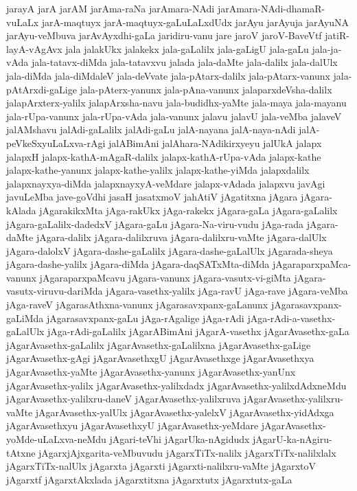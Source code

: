 {jarayA
jarA
jarAM
jarAma-raNa
jarAmara-NAdi
jarAmara-NAdi-dhamaR-vuLaLx
jarA-maqtuyx
jarA-maqtuyx-gaLuLaLxdUdx
jarAyu
jarAyuja
jarAyuNA
jarAyu-veMbuva
jarAvAyxdhi-gaLa
jaridiru-vanu
jare
jaroV
jaroV-BaveVtf
jatiR-layA-vAgAvx
jala
jalakUkx
jalakekx
jala-gaLalilx
jala-gaLigU
jala-gaLu
jala-ja-vAda
jala-tatavx-diMda
jala-tatavxvu
jalada
jala-daMte
jala-dalilx
jala-dalUlx
jala-diMda
jala-diMdaleV
jala-deVvate
jala-pAtarx-dalilx
jala-pAtarx-vanunx
jala-pAtArxdi-gaLige
jala-pAterx-yanunx
jala-pAna-vanunx
jalaparxdeVsha-dalilx
jalapArxterx-yalilx
jalapArxsha-navu
jala-budidhx-yaMte
jala-maya
jala-mayanu
jala-rUpa-vanunx
jala-rUpa-vAda
jala-vanunx
jalavu
jalavU
jala-veMba
jalaveV
jalAMshavu
jalAdi-gaLalilx
jalAdi-gaLu
jalA-nayana
jalA-naya-nAdi
jalA-peVkeSxyuLaLxva-rAgi
jalABimAni
jalAhara-NAdikirxyeyu
jalUkA
jalapx
jalapxH
jalapx-kathA-mAgaR-dalilx
jalapx-kathA-rUpa-vAda
jalapx-kathe
jalapx-kathe-yanunx
jalapx-kathe-yalilx
jalapx-kathe-yiMda
jalapxdalilx
jalapxnayxya-diMda
jalapxnayxyA-veMdare
jalapx-vAdada
jalapxvu
javAgi
javuLeMba
jave-goVdhi
jasaH
jasatxmoV
jahAtiV
jAgatitxna
jAgara
jAgara-kAlada
jAgarakikxMta
jAga-rakUkx
jAga-rakekx
jAgara-gaLa
jAgara-gaLalilx
jAgara-gaLalilx-dadedxV
jAgara-gaLu
jAgara-Na-viru-vudu
jAga-rada
jAgara-daMte
jAgara-dalilx
jAgara-dalilxruva
jAgara-dalilxru-vaMte
jAgara-dalUlx
jAgara-dalolxV
jAgara-dashe-gaLalilx
jAgara-dashe-gaLalUlx
jAgarada-sheya
jAgara-dashe-yalilx
jAgara-diMda
jAgara-daqSATxMta-diMda
jAgaraparxpaMca-vanunx
jAgaraparxpaMcavu
jAgara-vanunx
jAgara-vasutx-vi-giMta
jAgara-vasutx-viruvu-dariMda
jAgara-vasethx-yalilx
jAga-ravU
jAga-rave
jAgara-veMba
jAga-raveV
jAgarasAthxna-vanunx
jAgarasavxpanx-gaLanunx
jAgarasavxpanx-gaLiMda
jAgarasavxpanx-gaLu
jAga-rAgalige
jAga-rAdi
jAga-rAdi-a-vasethx-gaLalUlx
jAga-rAdi-gaLalilx
jAgarABimAni
jAgarA-vasethx
jAgarAvasethx-gaLa
jAgarAvasethx-gaLalilx
jAgarAvasethx-gaLalilxna
jAgarAvasethx-gaLige
jAgarAvasethx-gAgi
jAgarAvasethxgU
jAgarAvasethxge
jAgarAvasethxya
jAgarAvasethx-yaMte
jAgarAvasethx-yanunx
jAgarAvasethx-yanUnx
jAgarAvasethx-yalilx
jAgarAvasethx-yalilxdadx
jAgarAvasethx-yalilxdAdxneMdu
jAgarAvasethx-yalilxru-daneV
jAgarAvasethx-yalilxruva
jAgarAvasethx-yalilxru-vaMte
jAgarAvasethx-yalUlx
jAgarAvasethx-yalelxV
jAgarAvasethx-yidAdxga
jAgarAvasethxyu
jAgarAvasethxyU
jAgarAvasethx-yeMdare
jAgarAvasethx-yoMde-uLaLxva-neMdu
jAgari-teVhi
jAgarUka-nAgidudx
jAgarU-ka-nAgiru-tAtxne
jAgarxjAjxgarita-veMbuvudu
jAgarxTiTx-nalilx
jAgarxTiTx-nalilxlalx
jAgarxTiTx-nalUlx
jAgarxta
jAgarxti
jAgarxti-nalilxru-vaMte
jAgarxtoV
jAgarxtf
jAgarxtAkxlada
jAgarxtitxna
jAgarxtutx
jAgarxtutx-gaLa
}
